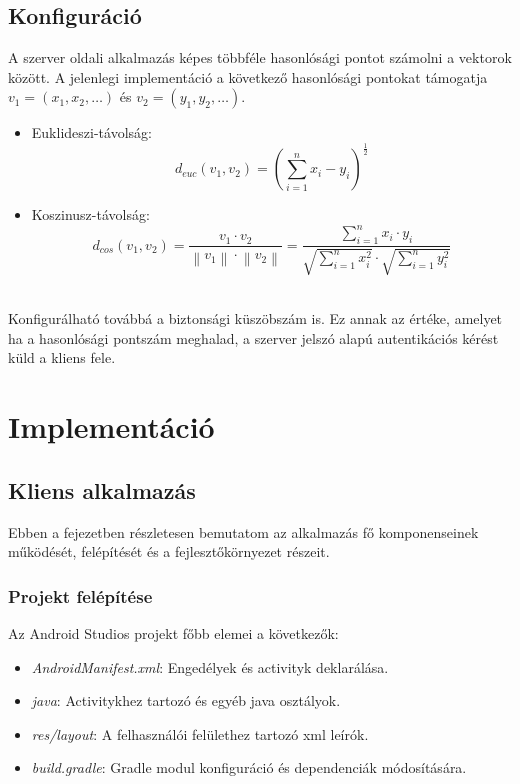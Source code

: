 \subsection{Konfiguráció}

A szerver oldali alkalmazás képes többféle hasonlósági pontot számolni
a vektorok között. A jelenlegi implementáció a következő hasonlósági pontokat támogatja $v_1=(x_1, x_2, \dots)$ és $v_2=(y_1, y_2, \dots)$.

\begin{itemize}
	\item Euklideszi-távolság: $$d_{euc}(v_1, v_2) = \left (\sum_{i=1}^{n} x_i - y_i \right) ^\frac{1}{2}$$
	\item Koszinusz-távolság: $$d_{cos}(v_1, v_2) = \frac{v_1 \cdot v_2}{\left\lVert v_1 \right\rVert \cdot \left\lVert v_2 \right\rVert} = \frac{\sum_{i=1}^{n} x_i \cdot y_i}{\sqrt{\sum_{i=1}^{n} x_i^2} \cdot \sqrt{\sum_{i=1}^{n} y_i^2}}$$
\end{itemize}
\ \\
Konfigurálható továbbá a biztonsági küszöbszám is. Ez annak az értéke, amelyet
ha a hasonlósági pontszám meghalad, a szerver jelszó alapú autentikációs kérést küld a kliens fele.

\section{Implementáció}

\subsection{Kliens alkalmazás}

Ebben a fejezetben részletesen bemutatom az alkalmazás fő komponenseinek működését, felépítését és a fejlesztőkörnyezet részeit.

\subsubsection{Projekt felépítése}

Az Android Studios projekt főbb elemei a következők:

\begin{itemize}
	\item \emph{AndroidManifest.xml}: Engedélyek és activityk deklarálása.
	\item \emph{java}: Activitykhez tartozó és egyéb java osztályok.
	\item \emph{res/layout}: A felhasználói felülethez tartozó xml leírók.
	\item \emph{build.gradle}: Gradle modul konfiguráció és dependenciák módosítására.
\end{itemize}

